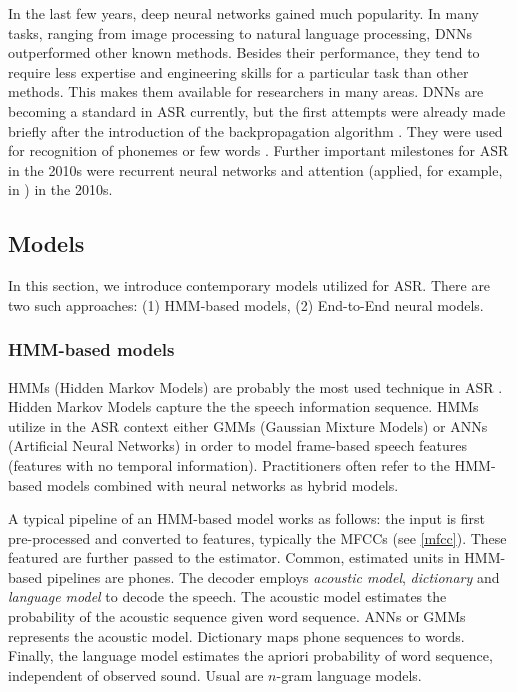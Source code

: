 In the last few years, deep neural networks gained much popularity. In many tasks, ranging from image processing to natural language processing, DNNs outperformed other known methods. Besides their performance, they tend to require less expertise and engineering skills for a particular task than other methods. This makes them available for researchers in many areas. DNNs are becoming a standard in ASR currently, but the first attempts were already made briefly after the introduction of the backpropagation algorithm . They were used for recognition of phonemes  or few words . Further important milestones for ASR in the 2010s were recurrent neural networks and attention (applied, for example, in ) in the 2010s.

\subsection{Models}
In this section, we introduce contemporary models utilized for ASR. There are two such approaches: (1) HMM-based models, (2) End-to-End neural models.

\subsubsection{HMM-based models}
HMMs (Hidden Markov Models) are probably the most used technique in ASR . Hidden Markov Models capture the the speech information sequence. HMMs utilize in the ASR context either GMMs (Gaussian Mixture Models) or ANNs (Artificial Neural Networks) in order to model frame-based speech features (features with no temporal information). Practitioners often refer to the HMM-based models combined with neural networks as hybrid models.

A typical pipeline of an HMM-based model works as follows: the input is first pre-processed and converted to features, typically the MFCCs (see \cref{mfcc}). These featured are further passed to the estimator. Common, estimated units in HMM-based pipelines are phones. The decoder employs \emph{acoustic model}, \emph{dictionary} and \emph{language model} to decode the speech. The acoustic model estimates the probability of the acoustic sequence given word sequence. ANNs or GMMs represents the acoustic model. Dictionary maps phone sequences to words. Finally, the language model estimates the apriori probability of word sequence, independent of observed sound. Usual are $n$-gram language models. 


